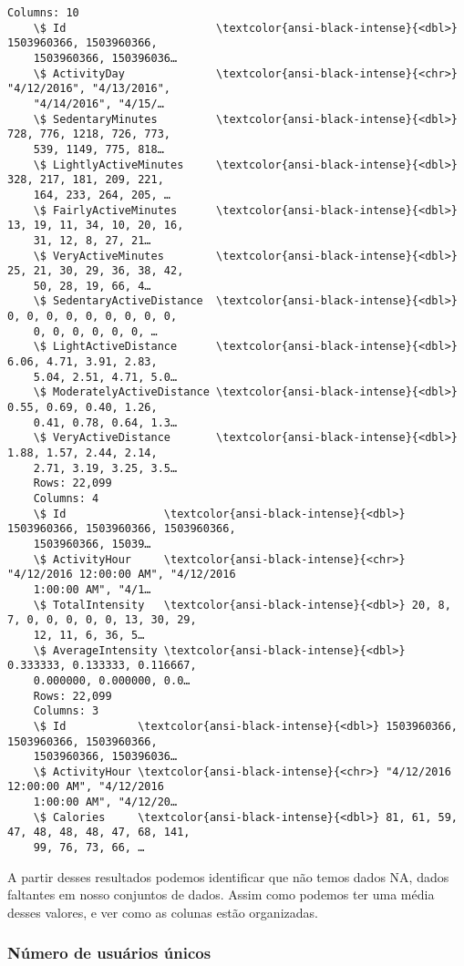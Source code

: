 \begin{Verbatim}[commandchars=\\\{\}]
    Columns: 10
    \$ Id                       \textcolor{ansi-black-intense}{<dbl>} 1503960366, 1503960366,
    1503960366, 150396036…
    \$ ActivityDay              \textcolor{ansi-black-intense}{<chr>} "4/12/2016", "4/13/2016",
    "4/14/2016", "4/15/…
    \$ SedentaryMinutes         \textcolor{ansi-black-intense}{<dbl>} 728, 776, 1218, 726, 773,
    539, 1149, 775, 818…
    \$ LightlyActiveMinutes     \textcolor{ansi-black-intense}{<dbl>} 328, 217, 181, 209, 221,
    164, 233, 264, 205, …
    \$ FairlyActiveMinutes      \textcolor{ansi-black-intense}{<dbl>} 13, 19, 11, 34, 10, 20, 16,
    31, 12, 8, 27, 21…
    \$ VeryActiveMinutes        \textcolor{ansi-black-intense}{<dbl>} 25, 21, 30, 29, 36, 38, 42,
    50, 28, 19, 66, 4…
    \$ SedentaryActiveDistance  \textcolor{ansi-black-intense}{<dbl>} 0, 0, 0, 0, 0, 0, 0, 0, 0,
    0, 0, 0, 0, 0, 0, …
    \$ LightActiveDistance      \textcolor{ansi-black-intense}{<dbl>} 6.06, 4.71, 3.91, 2.83,
    5.04, 2.51, 4.71, 5.0…
    \$ ModeratelyActiveDistance \textcolor{ansi-black-intense}{<dbl>} 0.55, 0.69, 0.40, 1.26,
    0.41, 0.78, 0.64, 1.3…
    \$ VeryActiveDistance       \textcolor{ansi-black-intense}{<dbl>} 1.88, 1.57, 2.44, 2.14,
    2.71, 3.19, 3.25, 3.5…
    Rows: 22,099
    Columns: 4
    \$ Id               \textcolor{ansi-black-intense}{<dbl>} 1503960366, 1503960366, 1503960366,
    1503960366, 15039…
    \$ ActivityHour     \textcolor{ansi-black-intense}{<chr>} "4/12/2016 12:00:00 AM", "4/12/2016
    1:00:00 AM", "4/1…
    \$ TotalIntensity   \textcolor{ansi-black-intense}{<dbl>} 20, 8, 7, 0, 0, 0, 0, 0, 13, 30, 29,
    12, 11, 6, 36, 5…
    \$ AverageIntensity \textcolor{ansi-black-intense}{<dbl>} 0.333333, 0.133333, 0.116667,
    0.000000, 0.000000, 0.0…
    Rows: 22,099
    Columns: 3
    \$ Id           \textcolor{ansi-black-intense}{<dbl>} 1503960366, 1503960366, 1503960366,
    1503960366, 150396036…
    \$ ActivityHour \textcolor{ansi-black-intense}{<chr>} "4/12/2016 12:00:00 AM", "4/12/2016
    1:00:00 AM", "4/12/20…
    \$ Calories     \textcolor{ansi-black-intense}{<dbl>} 81, 61, 59, 47, 48, 48, 48, 47, 68, 141,
    99, 76, 73, 66, …
\end{Verbatim}

A partir desses resultados podemos identificar que não temos dados NA,
dados faltantes em nosso conjuntos de dados. Assim como podemos ter uma
média desses valores, e ver como as colunas estão organizadas.

\subsubsection{Número de usuários únicos}

